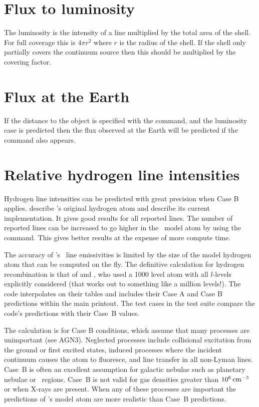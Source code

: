 \section{Flux to luminosity}

The luminosity is the intensity of a line multiplied by the total area
of the shell.
For full coverage this is $4\pi r^2$ where $r$ is the radius of the shell.
If the shell only partially covers the continuum source then this
should be multiplied by the covering factor.

\section{Flux at the Earth}

If the distance to the object is specified with the
 command,
and the luminosity case is predicted then the flux observed at the Earth
will be predicted if the  command
also appears.

\section{Relative hydrogen line intensities}

Hydrogen line intensities can be predicted with great precision when
Case B applies.
\citet{FergusonFerland1997} describe \Cloudy's
original hydrogen atom and
\citet{FerlandFabianEtAl2009} describe its current implementation.
It gives good results for all reported lines.
The number of reported lines can be increased to go higher in
the \hi\ model atom
by using the  command.
This gives better results at
the expense of more compute time.

The accuracy of \Cloudy's \hi\ line emissivities is limited by the size
of the model hydrogen atom that can be computed on the fly.
The definitive
calculation for hydrogen recombination is that of \citet{Hummer1987}
and \citet{Storey1995}, who used a 1000 level atom with all $l$-levels
explicitly considered
(that works out to something like a million levels!).
The code interpolates on their tables and includes their Case A and Case
B predictions within the main printout.
The test cases  in the test suite
compare the code's predictions with their Case~B values.

The \citet{Hummer1987} calculation is for Case B conditions, which
assume that many processes are unimportant (see AGN3).
Neglected processes include collisional excitation from the
ground or first excited states, induced processes where the incident
continuum causes the atom to fluoresce, and line transfer in all non-Lyman
lines.
Case~B is often an excellent assumption for galactic nebulae such
as planetary nebulae or \hii\ regions.
Case~B is not valid for gas densities
greater than $10^6 {\rm\thinspace cm^{-3}}$ or when X-rays are present.
When any of these
processes are important the
predictions of \Cloudy's model atom are more realistic than Case~B
predictions.

